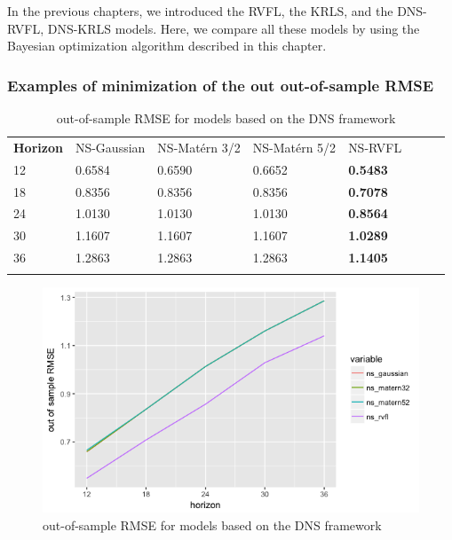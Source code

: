 In the previous chapters, we introduced the RVFL, the KRLS, and the DNS-RVFL, DNS-KRLS models. Here, we compare all these models by using the Bayesian optimization algorithm described in this chapter.  

\subsubsection{Examples of minimization of the out out-of-sample RMSE}


\begin{table}[!htb]
\begin{center}
\caption{out-of-sample RMSE for models based on the DNS framework}
\label{tab:min_value_ns}       %
\begin{tabular}{llllllll}
\hline\noalign{\smallskip}
\textbf{Horizon} & NS-Gaussian & NS-Mat\'ern 3/2  & NS-Mat\'ern 5/2 & NS-RVFL \\
\noalign{\smallskip}\hline\noalign{\smallskip}
 12 & 0.6584  &  0.6590   &   0.6652 & \textbf{0.5483} \\
 18 & 0.8356  &  0.8356   &   0.8356 & \textbf{0.7078} \\
 24 & 1.0130  &  1.0130   &   1.0130 & \textbf{0.8564}\\
 30 & 1.1607  &  1.1607   &   1.1607 & \textbf{1.0289} \\
 36 & 1.2863  &  1.2863   &   1.2863 & \textbf{1.1405} \\
\noalign{\smallskip}\hline
\end{tabular}
\end{center}
\end{table}

\begin{figure}[!htb]
\centering
\includegraphics[width=12cm]{gfx/chapter-bayesianrvfl/oos_ns_krls.png}
\caption{out-of-sample RMSE for models based on the DNS framework}
\label{oos_ns_krls}
\end{figure}

